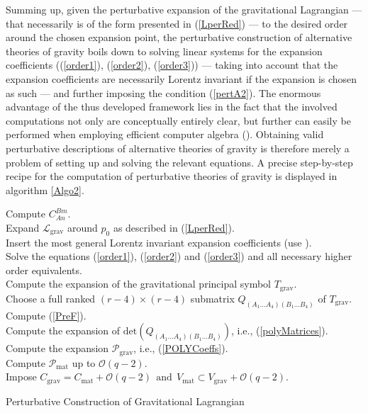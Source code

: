 \documentclass[%
 reprint,
nofootinbib,
 amsmath,amssymb,
 aps,
 prd,
floatfix,
]{revtex4-2}
\begin{document}
Summing up, given the perturbative expansion of the gravitational Lagrangian --- that necessarily is of the form presented in (\ref{LperRed}) --- to the desired order around the chosen expansion point, the perturbative construction of alternative theories of gravity boils down to solving linear systems for the expansion coefficients ((\ref{order1}), (\ref{order2}), (\ref{order3})) --- taking into account that the expansion coefficients are necessarily Lorentz invariant if the expansion is chosen as such --- and further imposing the condition
(\ref{pertA2}). The enormous advantage of the thus developed framework lies in the fact that the involved computations not only are conceptually entirely clear, but further can easily be performed when employing efficient computer algebra (\cite{sparse-tensor}). Obtaining valid perturbative descriptions of alternative theories of gravity is therefore merely a problem of setting up and solving the relevant equations. A precise step-by-step recipe for the computation of perturbative theories of gravity is displayed in algorithm \ref{Algo2}.
\begin{algorithm}[hbt!]
\SetAlgoLined
{}
Compute $C^{Bm}_{An}$. \\
Expand $\mathcal{L}_{\text{grav}}$ around $p_0$ as described in (\ref{LperRed}).\\
Insert the most general Lorentz invariant expansion coefficients (use \cite{sparse-tensor}).\\
Solve the equations (\ref{order1}), (\ref{order2}) and (\ref{order3}) and all necessary higher order equivalents.\\
Compute the expansion of the gravitational principal symbol $T_{\text{grav}}$.\\
Choose a full ranked $(r-4) \times (r-4)$ submatrix $Q_{(A_1...A_4)(B_1...B_4)}$ of $T_{\text{grav}}$. \\
Compute (\ref{PreF}).\\
Compute the expansion of $\mathrm{det}(Q_{(A_1...A_4)(B_1...B_4)})$, i.e., (\ref{polyMatrices}). \\
Compute the expansion $\mathcal{P}_{\text{grav}}$, i.e., (\ref{POLYCoeffs}). \\
Compute $\mathcal{P}_{\text{mat}}$ up to $\mathcal{O}(q-2)$.\\
Impose $C_{\text{grav}} = C_{\text{mat}} + \mathcal{O}(q-2) \ \ \text{and} \ \ V_{\text{mat}} \subset V_{\text{grav}} + \mathcal{O}(q-2)$.
 \caption{Perturbative Construction of Gravitational Lagrangian}\label{Algo2}
\end{algorithm}
\end{document}
